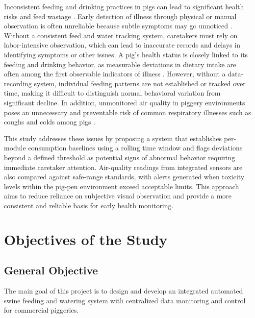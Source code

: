 Inconsistent feeding and drinking practices in pigs can lead to significant health risks and feed wastage \cite{oecdfao2025outlook}. Early detection of illness through physical or manual observation is often unreliable because subtle symptoms may go unnoticed \cite{usda2026pork}. Without a consistent feed and water tracking system, caretakers must rely on labor-intensive observation, which can lead to inaccurate records and delays in identifying symptoms or other issues. A pig's health status is closely linked to its feeding and drinking behavior, as measurable deviations in dietary intake are often among the first observable indicators of illness \cite{dingcong2017monitoring}. However, without a data-recording system, individual feeding patterns are not established or tracked over time, making it difficult to distinguish normal behavioral variation from significant decline. In addition, unmonitored air quality in piggery environments poses an unnecessary and preventable risk of common respiratory illnesses such as coughs and colds among pigs \cite{livestockproduction2026}.

This study addresses these issues by proposing a system that establishes per-module consumption baselines using a rolling time window and flags deviations beyond a defined threshold as potential signs of abnormal behavior requiring immediate caretaker attention. Air-quality readings from integrated sensors are also compared against safe-range standards, with alerts generated when toxicity levels within the pig-pen environment exceed acceptable limits. This approach aims to reduce reliance on subjective visual observation and provide a more consistent and reliable basis for early health monitoring.


\section{Objectives of the Study}

\subsection{General Objective}
The main goal of this project is to design and develop an integrated automated swine feeding and watering system with centralized data monitoring and control for commercial piggeries.


